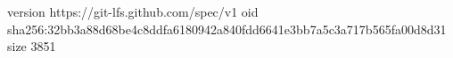 version https://git-lfs.github.com/spec/v1
oid sha256:32bb3a88d68be4c8ddfa6180942a840fdd6641e3bb7a5c3a717b565fa00d8d31
size 3851
